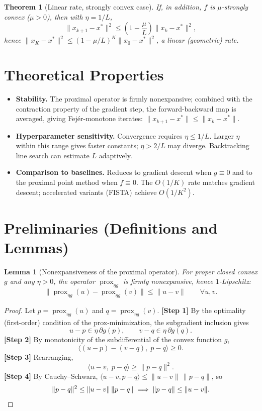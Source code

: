 \documentclass[11pt]{article}
\newtheorem{theorem}{Theorem}
\newtheorem{lemma}{Lemma}
\begin{document}
\begin{theorem}[Linear rate, strongly convex case]\label{thm:strong}
If, in addition, $f$ is $\mu$-strongly convex ($\mu>0$), then with $\eta = 1/L$,
\[
\|x_{k+1} - x^\ast\|^2 \le \left(1 - \frac{\mu}{L}\right)\|x_k - x^\ast\|^2,
\]
hence $\|x_K - x^\ast\|^2 \le (1-\mu/L)^K \|x_0 - x^\ast\|^2$, a linear (geometric) rate.
\end{theorem}

\section*{Theoretical Properties}

\begin{itemize}
\item \textbf{Stability.} The proximal operator is firmly nonexpansive; combined with the contraction property of the gradient step, the forward-backward map is averaged, giving Fej\'er-monotone iterates: $\|x_{k+1}-x^\ast\|\le\|x_k-x^\ast\|$.
\item \textbf{Hyperparameter sensitivity.} Convergence requires $\eta\le 1/L$. Larger $\eta$ within this range gives faster constants; $\eta>2/L$ may diverge. Backtracking line search can estimate $L$ adaptively.
\item \textbf{Comparison to baselines.} Reduces to gradient descent when $g\equiv0$ and to the proximal point method when $f\equiv0$. The $O(1/K)$ rate matches gradient descent; accelerated variants (FISTA) achieve $O(1/K^2)$.
\end{itemize}

\section*{Preliminaries (Definitions and Lemmas)}

\begin{lemma}[Nonexpansiveness of the proximal operator]\label{lem:nonexp}
For proper closed convex $g$ and any $\eta>0$, the operator $\operatorname{prox}_{\eta g}$ is firmly nonexpansive, hence $1$-Lipschitz:
\[
\|\operatorname{prox}_{\eta g}(u) - \operatorname{prox}_{\eta g}(v)\| \le \|u-v\| \qquad \forall u,v.
\]
\end{lemma}
\begin{proof}
Let $p = \operatorname{prox}_{\eta g}(u)$ and $q = \operatorname{prox}_{\eta g}(v)$.
\textbf{[Step 1]} By the optimality (first-order) condition of the prox-minimization, the subgradient inclusion gives
\[
u - p \in \eta\,\partial g(p), \qquad v - q \in \eta\,\partial g(q).
\]
\textbf{[Step 2]} By monotonicity of the subdifferential of the convex function $g$,
\[
\langle (u-p) - (v-q),\; p - q\rangle \ge 0.
\]
\textbf{[Step 3]} Rearranging,
\[
\langle u-v,\; p-q\rangle \ge \|p-q\|^2.
\]
\textbf{[Step 4]} By Cauchy--Schwarz, $\langle u-v, p-q\rangle \le \|u-v\|\,\|p-q\|$, so
\[
\|p-q\|^2 \le \|u-v\|\,\|p-q\| \implies \|p-q\| \le \|u-v\|. \qedhere
\]
\end{proof}
\end{document}
